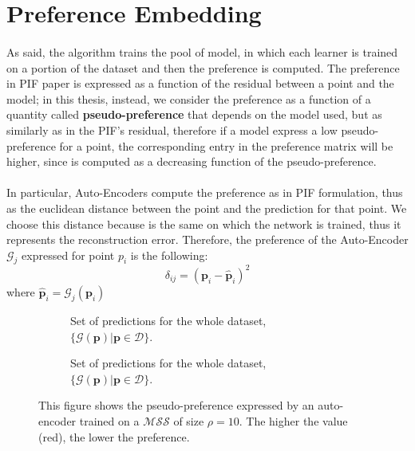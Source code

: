 \section{Preference Embedding}
\paragraph{}
As said, the algorithm trains the pool of model, in which each learner is trained on a portion of the dataset and then the preference is computed. The preference in PIF paper is expressed as a function of the residual between a point and the model; in this thesis, instead, we consider the preference as a function of a quantity called \textbf{pseudo-preference} that depends on the model used, but as similarly as in the PIF's residual, therefore if a model express a low pseudo-preference for a point, the corresponding entry in the preference matrix will be higher, since is computed as a decreasing function of the pseudo-preference.

\paragraph{}
In particular, Auto-Encoders compute the preference as in PIF formulation, thus as the euclidean distance between the point and the prediction for that point. We choose this distance because is the same on which the network is trained, thus it represents the reconstruction error. Therefore, the preference of the Auto-Encoder $\mathcal{G}_j$ expressed for point $p_i$ is the following:
\begin{equation}
\label{eq:ae_preference}
    \delta_{ij} = (\textbf{p}_i - \hat{\textbf{p}}_i)^2
\end{equation}
where $\hat{\textbf{p}}_i = \mathcal{G}_j(\textbf{p}_i)$

\begin{figure}[hb]
     \centering
     \begin{subfigure}[b]{0.45\textwidth}
         \centering
        
         \caption{Set of predictions for the whole dataset, $\{ \mathcal{G}(\textbf{p}) | \textbf{p} \in \mathcal{D} \}$.}
         \label{subfig:ae_mss_preds}
     \end{subfigure}
     \hfill
     \begin{subfigure}[b]{0.45\textwidth}
         \centering
        
         \caption{Set of predictions for the whole dataset, $\{ \mathcal{G}(\textbf{p}) | \textbf{p} \in \mathcal{D} \}$.}
         \label{subfig:ae_mss_res}
     \end{subfigure}
     \caption{This figure shows the pseudo-preference expressed by an auto-encoder trained on a $\mathcal{MSS}$ of size $\rho = 10$. The higher the value (red), the lower the preference.}
     \label{fig:ae_residuals}
\end{figure}

